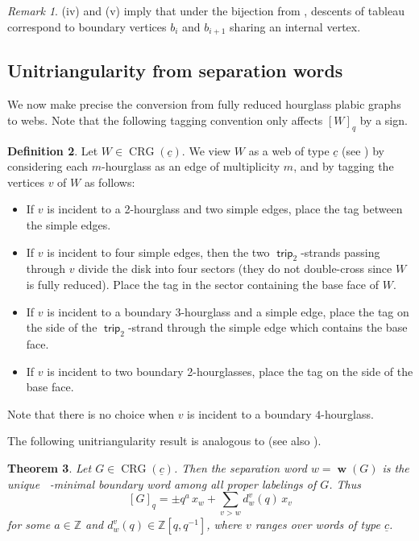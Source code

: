 \documentclass{amsart}
\newtheorem{theorem}{Theorem}[section]
\theoremstyle{definition}
\newtheorem{definition}[theorem]{Definition}
\theoremstyle{remark}
\newtheorem{remark}[theorem]{Remark}
\numberwithin{equation}{section}
\DeclareMathOperator{\trip}{\mathsf{trip}}
\DeclareMathOperator{\bw}{\mathbf{w}}
\DeclareMathOperator{\crg}{CRG}
\DeclareMathOperator{\tlex}{l\widetilde{ex}}
\begin{document}
\begin{remark}
    (iv) and (v) imply that under the bijection from , descents of tableau correspond to boundary vertices $b_i$ and $b_{i+1}$ sharing an internal vertex. 
\end{remark}

\subsection{Unitriangularity from separation words}

We now make precise the conversion from fully reduced hourglass plabic graphs to webs. Note that the following tagging convention only affects $[W]_q$ by a sign.

\begin{definition}
\label{def:hourglass-tagging-convention}
Let $W \in \crg(\underline{c})$. We view $W$ as a web of type $\underline{c}$ (see ) by considering each $m$-hourglass as an edge of multiplicity $m$, and by tagging the vertices $v$ of $W$ as follows: 
\begin{itemize}
    \item If $v$ is incident to a 2-hourglass and two simple edges, place the tag between the simple edges.
    \item If $v$ is incident to four simple edges, then the two $\trip_2$-strands passing through $v$ divide the disk into four sectors (they do not double-cross since $W$ is fully reduced). Place the tag in the sector containing the base face of $W$.
    \item If $v$ is incident to a boundary 3-hourglass and a simple edge, place the tag on the side of the $\trip_2$-strand through the simple edge which contains the base face.
    \item If $v$ is incident to two boundary 2-hourglasses, place the tag on the side of the base face.
\end{itemize}
\noindent Note that there is no choice when $v$ is incident to a boundary $4$-hourglass.
\end{definition}

The following unitriangularity result is analogous to \cite[Thm.~2]{Khovanov-Kuperberg} (see also \cite[Thm.~3.2]{LACIM}). 

\begin{theorem}\label{thm:unitriangular}
  Let $G \in \crg(\underline{c})$. Then the separation word $w = \bw(G)$ is the unique $\tlex$-minimal boundary word among all proper labelings of $G$. Thus
  \begin{equation}\label{eq:unitriangular}
    [G]_q = \pm q^a\,x_w + \sum_{v >_{\tlex} w} d_w^v(q)\,x_v
  \end{equation}
  for some $a \in \mathbb{Z}$ and $d_w^v(q) \in \mathbb{Z}[q, q^{-1}]$, where $v$ ranges over words of type $\underline{c}$.
\end{theorem}
\end{document}
